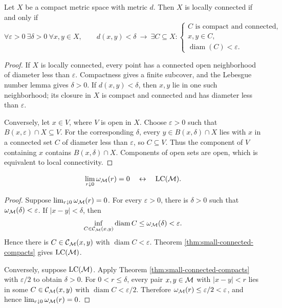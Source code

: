 \begin{theorem}
\label{thm:small-connected-compacts}
Let \(X\) be a compact metric space with metric \(d\). Then \(X\) is
locally connected if and only if
\[
 \forall\varepsilon>0\ \exists\delta>0\ \forall x,y\in X,\qquad
 d(x,y)<\delta\ \to\
 \exists C\subseteq X:
 \begin{cases}
 C\text{ is compact and connected},\\
 x,y\in C,\\
 \operatorname{diam}(C)<\varepsilon.
 \end{cases}
\]
\end{theorem}
\begin{proof}
If \(X\) is locally connected, every point has a connected open
neighborhood of diameter less than \(\varepsilon\). Compactness gives a
finite subcover, and the Lebesgue number lemma gives \(\delta>0\). If
\(d(x,y)<\delta\), then \(x,y\) lie in one such neighborhood; its
closure in \(X\) is compact and connected and has diameter less than
\(\varepsilon\).

Conversely, let \(x\in V\), where \(V\) is open in \(X\). Choose
\(\varepsilon>0\) such that \(B(x,\varepsilon)\cap X\subseteq V\).
For the corresponding \(\delta\), every \(y\in B(x,\delta)\cap X\)
lies with \(x\) in a connected set \(C\) of diameter less than
\(\varepsilon\), so \(C\subseteq V\). Thus the component of \(V\)
containing \(x\) contains \(B(x,\delta)\cap X\). Components of open
sets are open, which is equivalent to local connectivity.
\end{proof}

\begin{proposition}[Local Connectivity Criterion via \(\omega_\M\)]
\label{prop:omega-criterion}
\[
 \lim_{r\downarrow0}\omega_\mathcal M(r)=0
 \quad\leftrightarrow\quad
 \operatorname{LC}(\mathcal M).
\]
\end{proposition}
\begin{proof}
Suppose \(\lim_{r\downarrow0}\omega_\mathcal M(r)=0\). For every
\(\varepsilon>0\), there is \(\delta>0\) such that
\(\omega_\mathcal M(\delta)<\varepsilon\). If \(|x-y|<\delta\), then
\[
 \inf_{C\in\mathcal C_\mathcal M(x,y)}\operatorname{diam}C
 \le\omega_\mathcal M(\delta)<\varepsilon.
\]
Hence there is \(C\in\mathcal C_\mathcal M(x,y)\) with
\(\operatorname{diam}C<\varepsilon\). Theorem
\ref{thm:small-connected-compacts} gives \(\operatorname{LC}(\mathcal M)\).

Conversely, suppose \(\operatorname{LC}(\mathcal M)\). Apply Theorem
\ref{thm:small-connected-compacts} with \(\varepsilon/2\) to obtain
\(\delta>0\). For \(0<r\le\delta\), every pair \(x,y\in\mathcal M\) with
\(|x-y|<r\) lies in some \(C\in\mathcal C_\mathcal M(x,y)\) with
\(\operatorname{diam}C<\varepsilon/2\). Therefore
\(\omega_\mathcal M(r)\le\varepsilon/2<\varepsilon\), and hence
\(\lim_{r\downarrow0}\omega_\mathcal M(r)=0\).
\end{proof}
